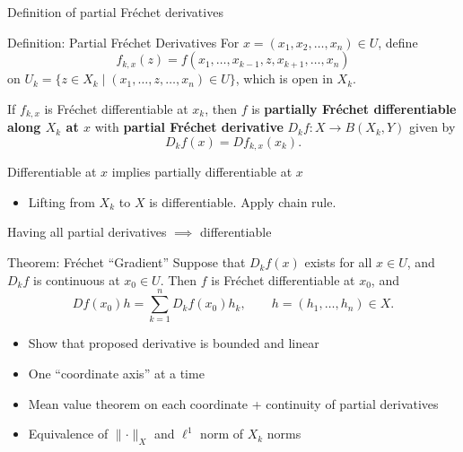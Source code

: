 \documentclass[]{beamer}
\begin{document}
	\begin{frame}{Definition of partial Fréchet derivatives}
		\begin{block}{Definition: Partial Fréchet Derivatives}
			For $x = (x_1, x_2, \dots, x_n) \in U$, define
			\begin{equation*}
				f_{k,x}(z) = f(x_1, \dots, x_{k-1}, z, x_{k+1},\dots, x_n)
			\end{equation*}
			on $U_k = \{z \in X_k \mid (x_1, \dots, z, \dots, x_n) \in U\}$, which is open in $X_k$. 
			\vspace{1em}
			
			If $f_{k,x}$ is Fréchet differentiable at $x_k$, then $f$ is \textbf{partially Fréchet differentiable along $X_k$ at $x$} with \textbf{partial Fréchet derivative} $D_kf : X \to B(X_k,Y)$ given by
			\begin{equation*}
				D_kf(x) = Df_{k,x}(x_k).
			\end{equation*}
		\end{block}
		\vfill
		Differentiable at $x$ implies partially differentiable at $x$
		\begin{itemize}
			\item Lifting from $X_k$ to $X$ is differentiable. Apply chain rule.
		\end{itemize}
	\end{frame}
	
	\begin{frame}{Having all partial derivatives $\implies$ differentiable}
		\begin{block}{Theorem: Fréchet ``Gradient''}
			Suppose that $D_kf(x)$ exists for all $x \in U$, and $D_kf$ is continuous at $x_0 \in U$. Then $f$ is Fréchet differentiable at $x_0$, and
			\begin{equation*}
				Df(x_0)h = \sum_{k=1}^n D_kf(x_0)h_k, \qquad h = (h_1, \dots, h_n) \in X.
			\end{equation*}
		\end{block}
		\vfill
		\begin{itemize}
			\item Show that proposed derivative is bounded and linear
			\item One ``coordinate axis'' at a time
			\item Mean value theorem on each coordinate + continuity of partial derivatives
			\item Equivalence of $\lVert \cdot \rVert_X$ and $\ell^1$ norm of $X_k$ norms
		\end{itemize}
	\end{frame}
\end{document}
